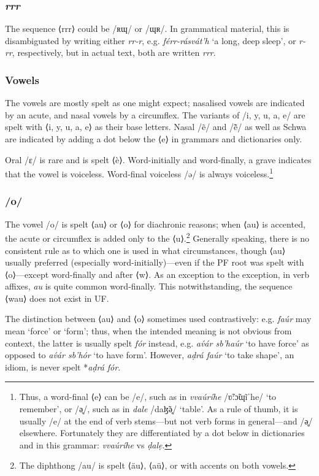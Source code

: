 \documentclass[a4paper, 12pt, twoside, final]{article}
\let \w \textit
\begin{document}
\subsubsection{\textit{rrr}}
The sequence ⟨rrr⟩ could be /ʀɰ/ or /ɰʀ/. In grammatical material, this is disambiguated by writing either \w{rr-r}, e.g.
\w{férr-rásvát’h} ‘a long, deep sleep’, or \w{r-rr}, respectively, but in actual text, both are written \w{rrr}.

\subsubsection{Vowels}
The vowels are mostly spelt as one might expect; nasalised vowels are indicated by an acute, and nasal vowels by a circumflex.
The variants of /i, y, u, a, e/ are spelt with ⟨i, y, u, a, e⟩ as their base letters. Nasal /ẽ/ and /ẽ̃/ as well as Schwa are
indicated by adding a dot below the ⟨e⟩ in grammars and dictionaries only.

Oral /ɛ/ is rare and is spelt ⟨è⟩. Word-initially and word-finally, a grave indicates that the vowel is voiceless. Word-final
voiceless /ə/ is always voiceless.\footnote{Thus, a word-final ⟨e⟩
can be /e/, such as in \w{vvaúríhe} /ʋ̃ːɔ̃ɰĩˈhe/ ‘to remember’, or /ə̥/, such as in \w{dale} /daɮ̃ə̥/ ‘table’. As a rule of thumb, it is
usually /e/ at the end of verb stems—but not verb forms in general—and /ə̥/ elsewhere. Fortunately they are differentiated by a
dot below in dictionaries and in this grammar: \w{vvaúríhe} vs \w{ḍalẹ}.}

\subsubsection{/o/}

The vowel /o/ is spelt ⟨au⟩ or ⟨o⟩ for diachronic reasons; when ⟨au⟩ is accented, the acute or circumflex is added only to the
⟨u⟩.\footnote{The diphthong /au/ is spelt ⟨äu⟩, ⟨aü⟩, or with accents on both vowels.} Generally speaking, there is no consistent
rule as to which one is used in what circumstances, though ⟨au⟩ usually preferred (especially word-initially)—even if the
PF root was spelt with ⟨o⟩—except word-finally and after ⟨w⟩. As an exception to the exception, in verb affixes, \w{au} is quite
common word-finally. This notwithstanding, the sequence ⟨wau⟩ does not exist in UF.

The distinction between ⟨au⟩ and ⟨o⟩ sometimes used contrastively: e.g. \w{faúr} may mean ‘force’ or ‘form’; thus, when the
intended meaning is not obvious from context, the latter is usually spelt \w{fór} instead, e.g. \w{av́ár sb’haúr} ‘to have force’
as opposed to \w{av́ár sb’hór} ‘to have form’. However, \w{aḍrá faúr} ‘to take shape’, an idiom, is never spelt *\w{aḍrá fór}.
\end{document}
